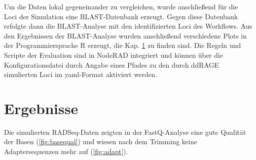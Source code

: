 Um die Daten lokal gegeneinander zu vergleichen, wurde anschließend für die Loci der Simulation eine BLAST-Datenbank erzeugt. Gegen diese Datenbank erfolgte dann die BLAST-Analyse mit den identifizierten Loci des Workflows. Aus den Ergebnissen der BLAST-Analyse wurden anschließend verschiedene Plots in der Programmiersprache R erzeugt, die Kap. \ref{sec:res} zu finden sind. Die Regeln und Scripte der Evaluation sind in NodeRAD integriert und können über die Konfigurationsdatei durch Angabe eines Pfades zu den durch ddRAGE simulierten Loci im yaml-Format aktiviert werden.

\section{Ergebnisse} \label{sec:res}

Die simulierten RADSeq-Daten zeigten in der FastQ-Analyse eine gute Qualität der Basen (\autoref{fig:basequal}) und wiesen nach dem Trimming keine Adaptersequenzen mehr auf (\autoref{fig:adapt}).\\

